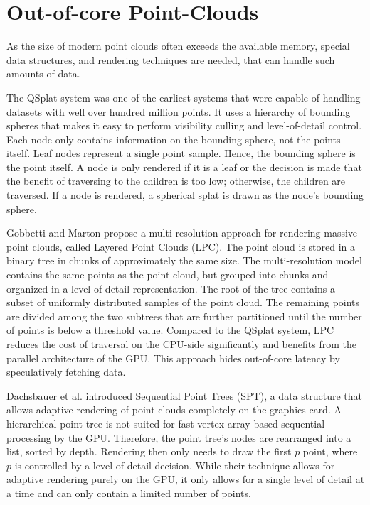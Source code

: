 \section {Out-of-core Point-Clouds}
\label{sec:related_work_point_clouds}

As the size of modern point clouds often exceeds the available memory, special data structures, and rendering techniques are needed, that can handle such amounts of data. 

The QSplat system \cite{rusinkiewicz2000qsplat} was one of the earliest systems that were capable of handling datasets with well over hundred million points. It uses a hierarchy of bounding spheres that makes it easy to perform visibility culling and level-of-detail control. Each node only contains information on the bounding sphere, not the points itself. Leaf nodes represent a single point sample. Hence, the bounding sphere is the point itself. A node is only rendered if it is a leaf or the decision is made that the benefit of traversing to the children is too low; otherwise, the children are traversed. If a node is rendered, a spherical splat is drawn as the node's bounding sphere. 

\par

Gobbetti and Marton \cite{gobbetti2004layered} propose a multi-resolution approach for rendering massive point clouds, called Layered Point Clouds (LPC). The point cloud is stored in a binary tree in chunks of approximately the same size. The multi-resolution model contains the same points as the point cloud, but grouped into chunks and organized in a level-of-detail representation. The root of the tree contains a subset of uniformly distributed samples of the point cloud. The remaining points are divided among the two subtrees that are further partitioned until the number of points is below a threshold value. Compared to the QSplat system, LPC reduces the cost of traversal on the CPU-side significantly and benefits from the parallel architecture of the GPU. This approach hides out-of-core latency by speculatively fetching data. 

\par

Dachsbauer et al. \cite{dachsbacher2003sequential} introduced Sequential Point Trees (SPT), a data structure that allows adaptive rendering of point clouds completely on the graphics card. A hierarchical point tree is not suited for fast vertex array-based sequential processing by the GPU. Therefore, the point tree's nodes are rearranged into a list, sorted by depth. Rendering then only needs to draw the first $p$ point, where $p$ is controlled by a level-of-detail decision. While their technique allows for adaptive rendering purely on the GPU, it only allows for a single level of detail at a time and can only contain a limited number of points. 

